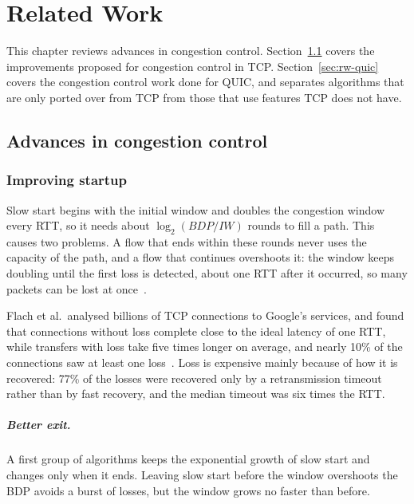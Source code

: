 \chapter{Related Work}\label{chap:related-work}

This chapter reviews advances in congestion control.
Section~\ref{sec:rw-tcp} covers the improvements proposed for congestion control in
TCP. Section~\ref{sec:rw-quic} covers the
congestion control work done for QUIC, and separates algorithms that are only ported over from TCP from those that use features TCP does not have.

\section{Advances in congestion control}\label{sec:rw-tcp}

\subsection{Improving startup}\label{sec:rw-startup}

Slow start begins with the initial window and doubles the congestion window every RTT,
so it needs about $\log_2(\mathit{BDP}/\mathit{IW})$ rounds to fill a path. This causes two problems. A flow that ends within these
rounds never uses the capacity of the path, and a flow that continues overshoots it:
the window keeps doubling until the first loss is detected, about one RTT after it
occurred, so many packets can be lost at once~\cite{ha2011taming}.

Flach et al.\ analysed billions of
TCP connections to Google's services, and found that connections without
loss complete close to the ideal latency of one RTT, while transfers with loss take
five times longer on average, and nearly 10\% of the connections saw at least one
loss~\cite{flach2013reducing}. Loss is expensive mainly because of how it is
recovered: 77\% of the losses were recovered only by a retransmission timeout rather
than by fast recovery, and the median timeout was six times the
RTT.


\paragraph{Better exit.} A first group of algorithms keeps the exponential growth of
slow start and changes only when it ends. Leaving slow start before the window
overshoots the BDP avoids a burst of losses, but the window grows no faster than
before.

